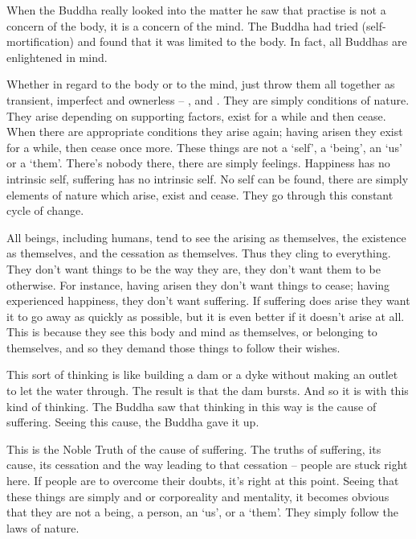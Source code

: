 When the Buddha really looked into the matter he saw that practise is not a concern of the body, it is a concern of the mind. The Buddha had tried  (self-mortification) and found that it was limited to the body. In fact, all Buddhas are enlightened in mind.

Whether in regard to the body or to the mind, just throw them all together as transient, imperfect and ownerless --  ,   and . They are simply conditions of nature. They arise depending on supporting factors, exist for a while and then cease. When there are appropriate conditions they arise again; having arisen they exist for a while, then cease once more. These things are not a `self', a `being', an `us' or a `them'. There's nobody there, there are simply feelings. Happiness has no intrinsic self, suffering has no intrinsic self. No self can be found, there are simply elements of nature which arise, exist and cease. They go through this constant cycle of change.

All beings, including humans, tend to see the arising as themselves, the existence as themselves, and the cessation as themselves. Thus they cling to everything. They don't want things to be the way they are, they don't want them to be otherwise. For instance, having arisen they don't want things to cease; having experienced happiness, they don't want suffering. If suffering does arise they want it to go away as quickly as possible, but it is even better if it doesn't arise at all. This is because they see this body and mind as themselves, or belonging to themselves, and so they demand those things to follow their wishes.

This sort of thinking is like building a dam or a dyke without making an outlet to let the water through. The result is that the dam bursts. And so it is with this kind of thinking. The Buddha saw that thinking in this way is the cause of suffering. Seeing this cause, the Buddha gave it up.

This is the Noble Truth of the cause of suffering. The truths of suffering, its cause, its cessation and the way leading to that cessation -- people are stuck right here. If people are to overcome their doubts, it's right at this point. Seeing that these things are simply  and  or corporeality and mentality, it becomes obvious that they are not a being, a person, an `us', or a `them'. They simply follow the laws of nature.

